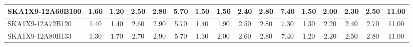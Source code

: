 \begin{table}[H]
{{\begin{tabular}{|lccccc||ccccc||ccccc|}
SKA1X9-12A60B100 & 1.60 \cellcolor{blue!60.00} & 1.20 \cellcolor{red!18.00} & 2.50 \cellcolor{green!32.00} & 2.80 \cellcolor{orange!46.00} & 5.70 \cellcolor{purple!60.00} & 1.50 \cellcolor{blue!46.00} & 1.50 \cellcolor{red!28.50} & 2.40 \cellcolor{green!18.00} & 2.80 \cellcolor{orange!60.00} & 7.40 \cellcolor{purple!60.00} & 1.50 \cellcolor{blue!43.20} & 2.00 \cellcolor{red!39.00} & 2.30 \cellcolor{green!32.00} & 2.50 \cellcolor{orange!28.50} & 11.00 \cellcolor{purple!60.00}\\ \hline 
SKA1X9-12A72B120 & 1.40 \cellcolor{blue!32.00} & 1.40 \cellcolor{red!28.50} & 2.60 \cellcolor{green!46.00} & 2.90 \cellcolor{orange!60.00} & 5.70 \cellcolor{purple!60.00} & 1.40 \cellcolor{blue!32.00} & 1.90 \cellcolor{red!49.50} & 2.50 \cellcolor{green!39.00} & 2.80 \cellcolor{orange!60.00} & 7.30 \cellcolor{purple!49.50} & 1.30 \cellcolor{blue!26.40} & 2.20 \cellcolor{red!60.00} & 2.40 \cellcolor{green!46.00} & 2.70 \cellcolor{orange!49.50} & 11.00 \cellcolor{purple!60.00}\\ \hline 
SKA1X9-12A80B133 & 1.30 \cellcolor{blue!18.00} & 1.70 \cellcolor{red!44.25} & 2.70 \cellcolor{green!60.00} & 2.90 \cellcolor{orange!60.00} & 5.70 \cellcolor{purple!60.00} & 1.30 \cellcolor{blue!18.00} & 2.00 \cellcolor{red!54.75} & 2.60 \cellcolor{green!60.00} & 2.80 \cellcolor{orange!60.00} & 7.40 \cellcolor{purple!60.00} & 1.20 \cellcolor{blue!18.00} & 2.20 \cellcolor{red!60.00} & 2.50 \cellcolor{green!60.00} & 2.80 \cellcolor{orange!60.00} & 11.00 \cellcolor{purple!60.00}\\ \hline 
\end{tabular}}
\vspace{-0.300000cm}
\hspace{1cm} 
}
\end{table}
